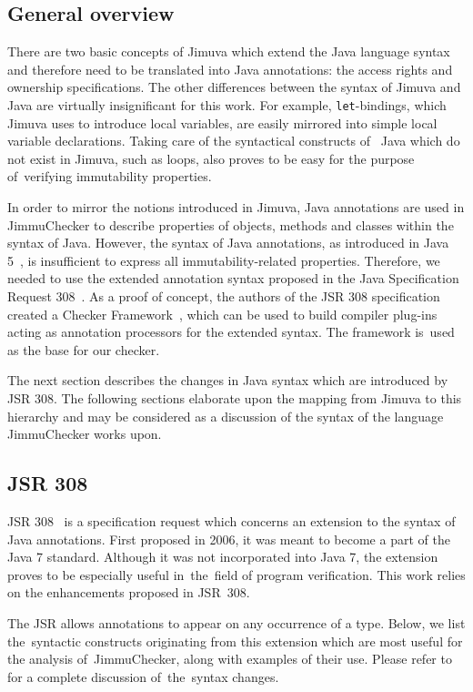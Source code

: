 \documentclass{pracamgr}
\theoremstyle{break}
\theoremstyle{break}
\theoremstyle{break}
\begin{document}
\subsection{General overview}

There are two basic concepts of Jimuva which extend the Java language
syntax and therefore need to be translated into Java annotations: the
access rights and ownership specifications. The other differences
between the syntax of Jimuva and Java are virtually insignificant for
this work. For example, \texttt{let}-bindings, which Jimuva uses to
introduce local variables, are easily mirrored into simple local
variable declarations. Taking care of the syntactical constructs of~
Java which do not exist in Jimuva, such as loops, also proves to be
easy for the purpose of~verifying immutability properties.

In order to mirror the notions introduced in Jimuva, Java annotations
are used in JimmuChecker to describe properties of objects, methods
and classes within the syntax of Java. However, the syntax of Java
annotations, as introduced in Java 5~\cite{jls3}, is insufficient to
express all immutability-related properties. Therefore, we needed to
use the extended annotation syntax proposed in the Java Specification
Request 308~\cite{jsr308}. As a proof of concept, the authors of the
JSR 308 specification created a Checker Framework~\cite{checkers},
which can be used to build compiler plug-ins acting as annotation
processors for the extended syntax. The framework is~used as the base
for our checker.

The next section describes the changes in Java syntax which are
introduced by JSR 308. The following sections elaborate upon the
mapping from Jimuva to this hierarchy and may be considered as a
discussion of the syntax of the language JimmuChecker works upon.

\subsection{JSR 308}
\label{sec:jsr308}

JSR 308~\cite{jsr308} is a specification request which concerns an
extension to the syntax of Java annotations. First proposed in 2006,
it was meant to become a part of the Java 7 standard. Although it was
not incorporated into Java 7, the extension proves to be especially
useful in~the~field of program verification. This work relies on the
enhancements proposed in JSR~308.

The JSR allows annotations to appear on any occurrence of a
type. Below, we list the~syntactic constructs originating from this
extension which are most useful for the analysis of~JimmuChecker,
along with examples of their use. Please refer to~\cite{jsr308} for a
complete discussion of~the~syntax changes.
\end{document}
